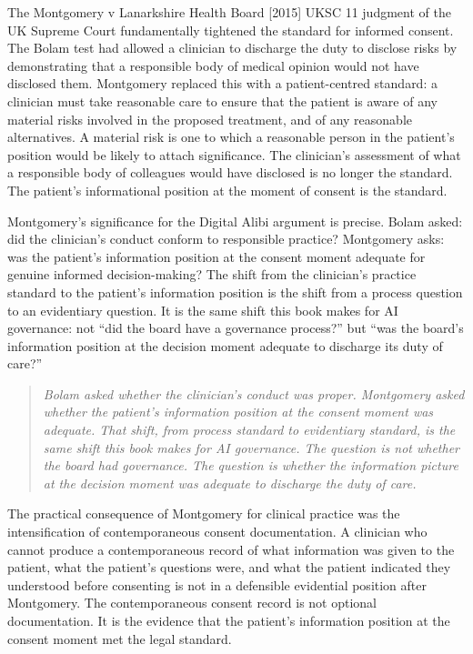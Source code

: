 The Montgomery v Lanarkshire Health Board {[}2015{]} UKSC 11 judgment of the UK Supreme Court fundamentally tightened the standard for informed consent. The Bolam test had allowed a clinician to discharge the duty to disclose risks by demonstrating that a responsible body of medical opinion would not have disclosed them. Montgomery replaced this with a patient-centred standard: a clinician must take reasonable care to ensure that the patient is aware of any material risks involved in the proposed treatment, and of any reasonable alternatives. A material risk is one to which a reasonable person in the patient's position would be likely to attach significance. The clinician's assessment of what a responsible body of colleagues would have disclosed is no longer the standard. The patient's informational position at the moment of consent is the standard.

Montgomery's significance for the Digital Alibi argument is precise. Bolam asked: did the clinician's conduct conform to responsible practice? Montgomery asks: was the patient's information position at the consent moment adequate for genuine informed decision-making? The shift from the clinician's practice standard to the patient's information position is the shift from a process question to an evidentiary question. It is the same shift this book makes for AI governance: not ``did the board have a governance process?'' but ``was the board's information position at the decision moment adequate to discharge its duty of care?''

\begin{quote}
\emph{Bolam asked whether the clinician's conduct was proper. Montgomery asked whether the patient's information position at the consent moment was adequate. That shift, from process standard to evidentiary standard, is the same shift this book makes for AI governance. The question is not whether the board had governance. The question is whether the information picture at the decision moment was adequate to discharge the duty of care.}
\end{quote}

The practical consequence of Montgomery for clinical practice was the intensification of contemporaneous consent documentation. A clinician who cannot produce a contemporaneous record of what information was given to the patient, what the patient's questions were, and what the patient indicated they understood before consenting is not in a defensible evidential position after Montgomery. The contemporaneous consent record is not optional documentation. It is the evidence that the patient's information position at the consent moment met the legal standard.

